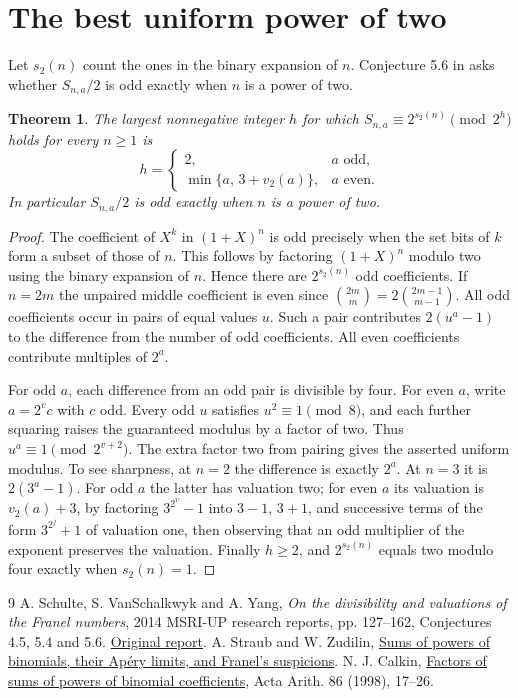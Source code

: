 \documentclass[10pt]{article}
\newtheorem{theorem}{Theorem}
\begin{document}
\section{The best uniform power of two}
Let $s_2(n)$ count the ones in the binary expansion of $n$.
Conjecture 5.6 in \cite{report} asks whether $S_{n,a}/2$ is odd
exactly when $n$ is a power of two.

\begin{theorem}
The largest nonnegative integer $h$ for which
$S_{n,a}\equiv 2^{s_2(n)}\pmod{2^h}$ holds for every $n\ge1$ is
\[
 h=\begin{cases}
  2,&a\text{ odd},\\
  \min\{a,\,3+v_2(a)\},&a\text{ even}.
 \end{cases}
\]
In particular $S_{n,a}/2$ is odd exactly when $n$ is a power of two.
\end{theorem}
\begin{proof}
The coefficient of $X^k$ in $(1+X)^n$ is odd precisely when the set
bits of $k$ form a subset of those of $n$. This follows by factoring
$(1+X)^n$ modulo two using the binary expansion of $n$. Hence there
are $2^{s_2(n)}$ odd coefficients. If $n=2m$ the unpaired middle
coefficient is even since $\binom{2m}{m}=2\binom{2m-1}{m-1}$.
All odd coefficients occur in pairs of equal values $u$.
Such a pair contributes $2(u^a-1)$ to the difference from the number
of odd coefficients. All even coefficients contribute multiples of
$2^a$.

For odd $a$, each difference from an odd pair is divisible by four.
For even $a$, write $a=2^v c$ with $c$ odd. Every odd $u$ satisfies
$u^2\equiv1\pmod8$, and each further squaring raises the guaranteed
modulus by a factor of two. Thus $u^a\equiv1\pmod{2^{v+2}}$.
The extra factor two from pairing gives the asserted uniform modulus.
To see sharpness, at $n=2$ the difference is exactly $2^a$.
At $n=3$ it is $2(3^a-1)$. For odd $a$ the latter has valuation two;
for even $a$ its valuation is $v_2(a)+3$, by factoring
$3^{2^v}-1$ into $3-1$, $3+1$, and successive terms of the form
$3^{2^j}+1$ of valuation one, then observing that an odd multiplier
of the exponent preserves the valuation. Finally $h\ge2$, and
$2^{s_2(n)}$ equals two modulo four exactly when $s_2(n)=1$.
\end{proof}

\small\begin{thebibliography}{9}
 A. Schulte, S. VanSchalkwyk and A. Yang,
\emph{On the divisibility and valuations of the Franel numbers},
2014 MSRI-UP research reports, pp. 127--162, Conjectures 4.5, 5.4 and 5.6.
\href{https://slmath-production-assets.sfo3.digitaloceanspaces.com/system/cms/files/81/files/original/Research_Reports_2014_MSRI-UP_%28Single_File%29.pdf}{Original report}.
 A. Straub and W. Zudilin,
\href{https://arminstraub.com/downloads/pub/franel-aperylimits.pdf}{Sums of powers
of binomials, their Ap\'ery limits, and Franel's suspicions}.
 N. J. Calkin, \href{https://www.math.clemson.edu/~calkin/Papers/factors_sums_powers_binomial_coefficients.pdf}{Factors of sums of powers of binomial coefficients}, Acta Arith. 86 (1998), 17--26.
\end{thebibliography}
\end{document}
